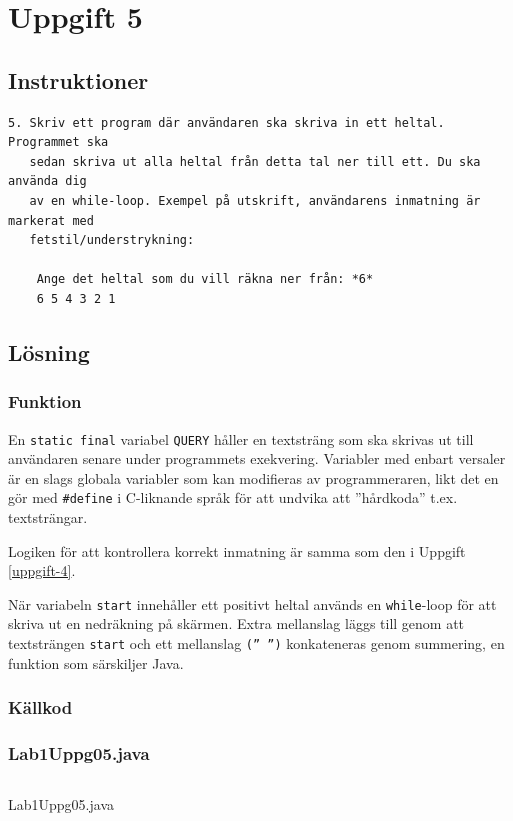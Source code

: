 \section{Uppgift 5}\label{uppgift-5}

\subsection{Instruktioner}
\begin{verbatim}
5. Skriv ett program där användaren ska skriva in ett heltal. Programmet ska
   sedan skriva ut alla heltal från detta tal ner till ett. Du ska använda dig
   av en while-loop. Exempel på utskrift, användarens inmatning är markerat med
   fetstil/understrykning:

    Ange det heltal som du vill räkna ner från: *6*
    6 5 4 3 2 1
\end{verbatim}

\subsection{Lösning}
\subsubsection{Funktion}
En \texttt{static final} variabel \texttt{QUERY} håller en textsträng som ska
skrivas ut till användaren senare under programmets exekvering.
Variabler med enbart versaler är en slags globala variabler som kan modifieras
av programmeraren, likt det en gör med \texttt{\#define} i C-liknande språk för
att undvika att ''hårdkoda'' t.ex. textsträngar.
\par Logiken för att kontrollera korrekt inmatning är samma som den i Uppgift
\ref{uppgift-4}.
\par När variabeln \texttt{start} innehåller ett positivt heltal används en
\texttt{while}-loop för att skriva ut en nedräkning på skärmen. Extra mellanslag
läggs till genom att textsträngen \texttt{start} och ett mellanslag 
\texttt{(''\ '')} konkateneras genom summering, en funktion som särskiljer Java.

\subsubsection{Källkod}\label{uppgift-5_src}
\subsubsection*{Lab1Uppg05.java}
    \inputminted[linenos]{java}{src/Lab1Uppg05.java}
    \caption{Lab1Uppg05.java}
    \label{Uppg5src}

